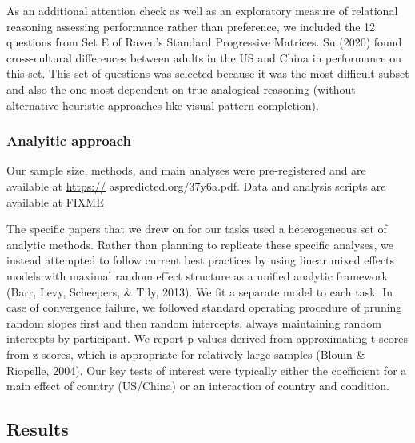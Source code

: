 \documentclass[
  man,floatsintext]{apa6}
\begin{document}
As an additional attention check as well as an exploratory measure of relational reasoning assessing performance rather than preference, we included the 12 questions from Set E of Raven's Standard Progressive Matrices. Su (2020) found cross-cultural differences between adults in the US and China in performance on this set. This set of questions was selected because it was the most difficult subset and also the one most dependent on true analogical reasoning (without alternative heuristic approaches like visual pattern completion).

\hypertarget{analyitic-approach}{%
\subsubsection{Analyitic approach}\label{analyitic-approach}}

Our sample size, methods, and main analyses were pre-registered and are available at \url{https://} aspredicted.org/37y6a.pdf. Data and analysis scripts are available at FIXME

The specific papers that we drew on for our tasks used a heterogeneous set of analytic methods. Rather than planning to replicate these specific analyses, we instead attempted to follow current best practices by using linear mixed effects models with maximal random effect structure as a unified analytic framework (Barr, Levy, Scheepers, \& Tily, 2013). We fit a separate model to each task. In case of convergence failure, we followed standard operating procedure of pruning random slopes first and then random intercepts, always maintaining random intercepts by participant. We report p-values derived from approximating t-scores from z-scores, which is appropriate for relatively large samples (Blouin \& Riopelle, 2004). Our key tests of interest were typically either the coefficient for a main effect of country (US/China) or an interaction of country and condition.

\hypertarget{results}{%
\subsection{Results}\label{results}}
\end{document}
